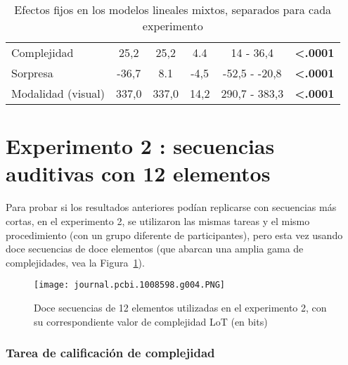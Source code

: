 \begin{table}[]
\begin{tabular}{lccccc}
Complejidad                   & 25,2                 & 25,2                 & 4.4                  & 14 - 36,4            & \textbf{\textless{}.0001} \\
Sorpresa                      & -36,7                & 8.1                  & -4,5                 & -52,5 - -20,8        & \textbf{\textless{}.0001} \\
Modalidad (visual)            & 337,0                & 337,0                & 14,2                 & 290,7 - 383,3        & \textbf{\textless{}.0001} \\ \hline
\end{tabular}
\caption{Efectos fijos en los modelos lineales mixtos, separados para cada experimento}
\label{PlosBIO-T1}
\end{table}

\section{Experimento 2 : secuencias auditivas con 12 elementos}


Para probar si los resultados anteriores podían replicarse con secuencias más cortas, en el experimento 2, se utilizaron las mismas tareas y el mismo procedimiento (con un grupo diferente de participantes), pero esta vez usando doce secuencias de doce elementos (que abarcan una amplia gama de complejidades, vea la Figura~\ref{PlosBIO-F4}).

\begin{figure}[t!]
      \texttt{[image: journal.pcbi.1008598.g004.PNG]}
      \centering
      \caption{Doce secuencias de 12 elementos utilizadas en el experimento 2, con su correspondiente valor de complejidad LoT (en bits)}
      \label{PlosBIO-F4}
\end{figure}

\subsubsection{Tarea de calificación de complejidad}

